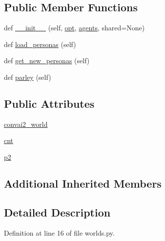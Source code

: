 \subsection*{Public Member Functions}
\begin{DoxyCompactItemize}
\item 
def \hyperlink{classparlai_1_1tasks_1_1convai2_1_1worlds_1_1InteractiveWorld_a5fb521abcaeae7438ab08feff1bdfccf}{\+\_\+\+\_\+init\+\_\+\+\_\+} (self, \hyperlink{classparlai_1_1core_1_1worlds_1_1World_a3640d92718acd3e6942a28c1ab3678bd}{opt}, \hyperlink{classparlai_1_1core_1_1worlds_1_1DialogPartnerWorld_a04185d1d55ca86c96c796f12f2226fc9}{agents}, shared=None)
\item 
def \hyperlink{classparlai_1_1tasks_1_1convai2_1_1worlds_1_1InteractiveWorld_aaf7775da8f8df0657d836225f3217a55}{load\+\_\+personas} (self)
\item 
def \hyperlink{classparlai_1_1tasks_1_1convai2_1_1worlds_1_1InteractiveWorld_acac91ca0d5cfc546437874e2f6d801a3}{get\+\_\+new\+\_\+personas} (self)
\item 
def \hyperlink{classparlai_1_1tasks_1_1convai2_1_1worlds_1_1InteractiveWorld_a75559c133b900cdd71389c9760e9a703}{parley} (self)
\end{DoxyCompactItemize}
\subsection*{Public Attributes}
\begin{DoxyCompactItemize}
\item 
\hyperlink{classparlai_1_1tasks_1_1convai2_1_1worlds_1_1InteractiveWorld_a448708b52db3c8f83b12464870c6fa6e}{convai2\+\_\+world}
\item 
\hyperlink{classparlai_1_1tasks_1_1convai2_1_1worlds_1_1InteractiveWorld_a3caeecc4c52e4dce168341bbb1519b03}{cnt}
\item 
\hyperlink{classparlai_1_1tasks_1_1convai2_1_1worlds_1_1InteractiveWorld_a8f91a884b0bcb293335e3b7cb6404a1f}{p2}
\end{DoxyCompactItemize}
\subsection*{Additional Inherited Members}


\subsection{Detailed Description}


Definition at line 16 of file worlds.\+py.



